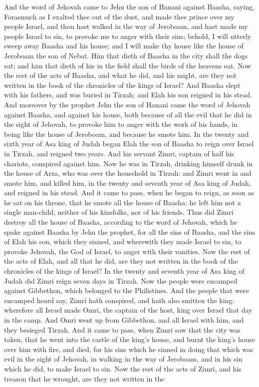 And the word of Jehovah came to Jehu the son of Hanani against Baasha, saying, Forasmuch as I exalted thee out of the dust, and made thee prince over my people Israel, and thou hast walked in the way of Jeroboam, and hast made my people Israel to sin, to provoke me to anger with their sins; behold, I will utterly sweep away Baasha and his house; and I will make thy house like the house of Jeroboam the son of Nebat. Him that dieth of Baasha in the city shall the dogs eat; and him that dieth of his in the field shall the birds of the heavens eat.  Now the rest of the acts of Baasha, and what he did, and his might, are they not written in the book of the chronicles of the kings of Israel? And Baasha slept with his fathers, and was buried in Tirzah; and Elah his son reigned in his stead. And moreover by the prophet Jehu the son of Hanani came the word of Jehovah against Baasha, and against his house, both because of all the evil that he did in the sight of Jehovah, to provoke him to anger with the work of his hands, in being like the house of Jeroboam, and because he smote him.  In the twenty and sixth year of Asa king of Judah began Elah the son of Baasha to reign over Israel in Tirzah, and reigned two years. And his servant Zimri, captain of half his chariots, conspired against him. Now he was in Tirzah, drinking himself drunk in the house of Arza, who was over the household in Tirzah: and Zimri went in and smote him, and killed him, in the twenty and seventh year of Asa king of Judah, and reigned in his stead. And it came to pass, when he began to reign, as soon as he sat on his throne, that he smote all the house of Baasha: he left him not a single man-child, neither of his kinsfolks, nor of his friends. Thus did Zimri destroy all the house of Baasha, according to the word of Jehovah, which he spake against Baasha by Jehu the prophet, for all the sins of Baasha, and the sins of Elah his son, which they sinned, and wherewith they made Israel to sin, to provoke Jehovah, the God of Israel, to anger with their vanities. Now the rest of the acts of Elah, and all that he did, are they not written in the book of the chronicles of the kings of Israel?  In the twenty and seventh year of Asa king of Judah did Zimri reign seven days in Tirzah. Now the people were encamped against Gibbethon, which belonged to the Philistines. And the people that were encamped heard say, Zimri hath conspired, and hath also smitten the king: wherefore all Israel made Omri, the captain of the host, king over Israel that day in the camp. And Omri went up from Gibbethon, and all Israel with him, and they besieged Tirzah. And it came to pass, when Zimri saw that the city was taken, that he went into the castle of the king’s house, and burnt the king’s house over him with fire, and died, for his sins which he sinned in doing that which was evil in the sight of Jehovah, in walking in the way of Jeroboam, and in his sin which he did, to make Israel to sin. Now the rest of the acts of Zimri, and his treason that he wrought, are they not written in the 